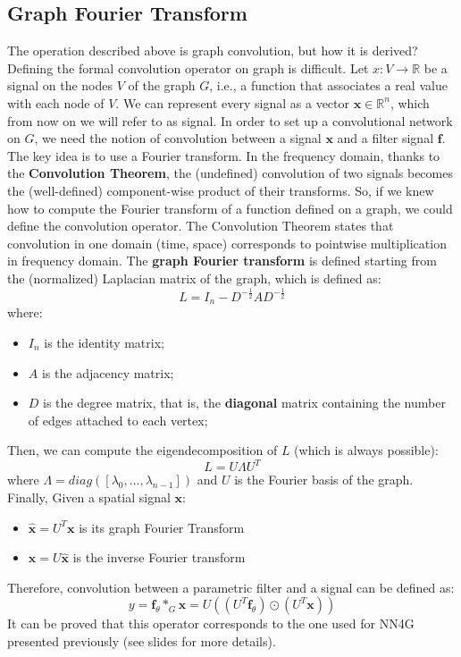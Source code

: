 \subsection{Graph Fourier Transform}
The operation described above is graph convolution, but how it is derived? Defining the formal convolution operator on graph is difficult.\newline\newline
Let $x: V \rightarrow \mathbb{R}$ be a signal on the nodes $V$ of the graph $G$, i.e., a function that associates a real value with each node of $V$. We can represent every signal as a vector $\textbf{x} \in \mathbb{R}^n$, which from now on we will refer to as signal. In order to set up a convolutional network on $G$, we need the notion of convolution between a signal $\textbf{x}$ and a filter signal $\textbf{f}$.\newline\newline
The key idea is to use a Fourier transform. In the frequency domain, thanks to the \textbf{Convolution Theorem}, the (undefined) convolution of two signals becomes the (well-defined) component-wise product of their transforms. So, if we knew how to compute the Fourier transform of a function defined on a graph, we could define the convolution operator.\newline\newline
The Convolution Theorem states that convolution in one domain (time, space) corresponds to pointwise multiplication in frequency domain.\newline\newline
The \textbf{graph Fourier transform} is defined starting from the (normalized) Laplacian matrix of the graph, which is defined as:
\[L = I_n - D^{-\frac{1}{2}} A D^{-\frac{1}{2}}\]
where:
\begin{itemize}
    \item $I_n$ is the identity matrix;
    \item $A$ is the adjacency matrix;
    \item $D$ is the degree matrix, that is, the \textbf{diagonal} matrix containing the number of edges attached to each vertex;
\end{itemize}
Then, we can compute the eigendecomposition of $L$ (which is always possible):
\[L = U \Lambda U^T\]
where $\Lambda = diag([\lambda_0, ..., \lambda_{n-1}])$ and $U$ is the Fourier basis of the graph.\newline\newline
Finally, Given a spatial signal $\textbf{x}$:
\begin{itemize}
    \item $\hat{\textbf{x}} = U^T\textbf{x}$ is its graph Fourier Transform

    \item $\textbf{x} = U \hat{\textbf{x}}$ is the inverse Fourier transform
\end{itemize}
Therefore, convolution between a parametric filter and a signal can be defined as:
\[y = \textbf{f}_\theta *_G \textbf{x} = U\left( (U^T\textbf{f}_\theta) \odot (U^T \textbf{x})\right)\]
It can be proved that this operator corresponds to the one used for NN4G presented previously (see slides for more details).

